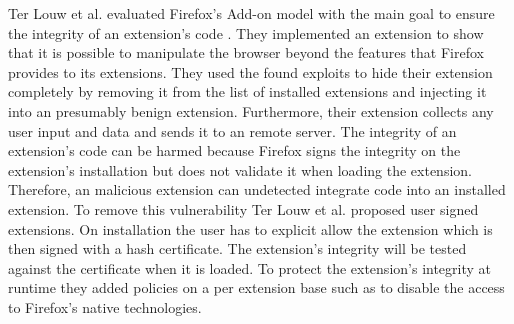 	Ter Louw et al. evaluated Firefox's Add-on model with the main goal to ensure the integrity of an extension's code \cite{TerLouw:2007:EWB:1420581.1420583}. They implemented an extension to show that it is possible to manipulate the browser beyond the features that Firefox provides to its extensions. They used the found exploits to hide their extension completely by removing it from the list of installed extensions and injecting it into an presumably benign extension. Furthermore, their extension collects any user input and data and sends it to an remote server. The integrity of an extension's code can be harmed because Firefox signs the integrity on the extension's installation but does not validate it when loading the extension. Therefore, an malicious extension can undetected integrate code into an installed extension. To remove this vulnerability Ter Louw et al. proposed user signed extensions. On installation the user has to explicit allow the extension which is then signed with a hash certificate. The extension's integrity will be tested against the certificate when it is loaded. To protect the extension's integrity at runtime they added policies on a per extension base such as to disable the access to Firefox's native technologies. %
	
